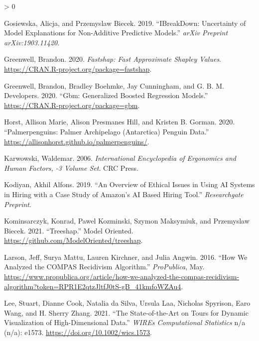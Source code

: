 \documentclass[
]{article}
\newlength{\cslhangindent}
\newenvironment{CSLReferences}[2] %
 {%
  \setlength{\parindent}{0pt}
  \ifodd #1 \everypar{\setlength{\hangindent}{\cslhangindent}}\ignorespaces\fi
  \ifnum #2 > 0
  \setlength{\parskip}{#2\baselineskip}
  \fi
 }%
 {}
\begin{document}
\begin{CSLReferences}{1}{0}
\leavevmode\hypertarget{ref-gosiewska_ibreakdown_2019}{}%
Gosiewska, Alicja, and Przemyslaw Biecek. 2019. {``{IBreakDown}: {Uncertainty} of Model Explanations for Non-Additive Predictive Models.''} \emph{arXiv Preprint arXiv:1903.11420}.

\leavevmode\hypertarget{ref-greenwell_fastshap_2020}{}%
Greenwell, Brandon. 2020. \emph{Fastshap: {Fast} {Approximate} {Shapley} {Values}}. \url{https://CRAN.R-project.org/package=fastshap}.

\leavevmode\hypertarget{ref-greenwell_gbm_2020}{}%
Greenwell, Brandon, Bradley Boehmke, Jay Cunningham, and G. B. M. Developers. 2020. {``Gbm: {Generalized} {Boosted} {Regression} {Models}.''} \url{https://CRAN.R-project.org/package=gbm}.

\leavevmode\hypertarget{ref-horst_palmerpenguins_2020}{}%
Horst, Allison Marie, Alison Presmanes Hill, and Kristen B. Gorman. 2020. {``Palmerpenguins: {Palmer} {Archipelago} ({Antarctica}) Penguin Data.''} \url{https://allisonhorst.github.io/palmerpenguins/}.

\leavevmode\hypertarget{ref-karwowski_international_2006}{}%
Karwowski, Waldemar. 2006. \emph{International {Encyclopedia} of {Ergonomics} and {Human} {Factors}, -3 {Volume} {Set}}. CRC Press.

\leavevmode\hypertarget{ref-kodiyan_overview_2019}{}%
Kodiyan, Akhil Alfons. 2019. {``An Overview of Ethical Issues in Using {AI} Systems in Hiring with a Case Study of {Amazon}'s {AI} Based Hiring Tool.''} \emph{Researchgate Preprint}.

\leavevmode\hypertarget{ref-kominsarczyk_treeshap_2021}{}%
Kominsarczyk, Konrad, Pawel Kozminski, Szymon Maksymiuk, and Przemyslaw Biecek. 2021. {``Treeshap.''} Model Oriented. \url{https://github.com/ModelOriented/treeshap}.

\leavevmode\hypertarget{ref-larson_how_2016}{}%
Larson, Jeff, Surya Mattu, Lauren Kirchner, and Julia Angwin. 2016. {``How {We} {Analyzed} the {COMPAS} {Recidivism} {Algorithm}.''} \emph{ProPublica}, May. \url{https://www.propublica.org/article/how-we-analyzed-the-compas-recidivism-algorithm?token=RPR1E2qtzJltfJ0tS-gB_41kmfoWZAu4}.

\leavevmode\hypertarget{ref-lee_state_2021}{}%
Lee, Stuart, Dianne Cook, Natalia da Silva, Ursula Laa, Nicholas Spyrison, Earo Wang, and H. Sherry Zhang. 2021. {``The State-of-the-Art on Tours for Dynamic Visualization of High-Dimensional Data.''} \emph{WIREs Computational Statistics} n/a (n/a): e1573. \url{https://doi.org/10.1002/wics.1573}.


\end{CSLReferences}
\end{document}
